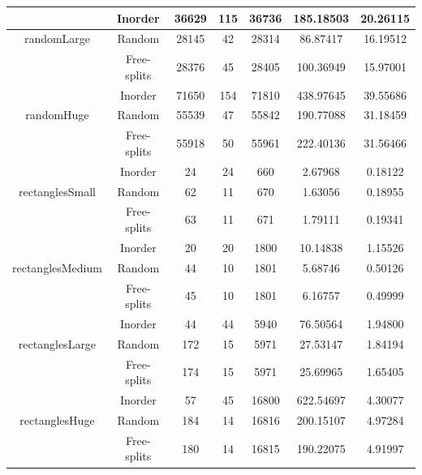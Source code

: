 \documentclass[11pt,a4paper]{article}
\theoremstyle{definition}
\theoremstyle{remark}
\begin{document}
\begin{table}
{\begin{tabular}{|c|c||c|c|c|c|c|}
\hline  
  & Inorder & 36629 & 115 & 36736 & 185.18503 & 20.26115 \\ 
\hline 
randomLarge & Random & 28145 & 42 & 28314 & 86.87417 & 16.19512 \\ 
\hline 
  & Free-splits & 28376 & 45 & 28405 & 100.36949 & 15.97001 \\ 
\hline
  & Inorder & 71650 & 154 & 71810 & 438.97645 & 39.55686 \\ 
\hline 
randomHuge & Random & 55539 & 47 & 55842 & 190.77088 & 31.18459 \\ 
\hline 
  & Free-splits & 55918 & 50 & 55961 & 222.40136 & 31.56466 \\ 
\hline
  & Inorder & 24 & 24 & 660 & 2.67968 & 0.18122 \\ 
\hline 
rectanglesSmall & Random & 62 & 11 & 670 & 1.63056 & 0.18955 \\ 
\hline 
  & Free-splits & 63 & 11 & 671 & 1.79111 & 0.19341 \\ 
\hline
  & Inorder & 20 & 20 & 1800 & 10.14838 & 1.15526 \\ 
\hline 
rectanglesMedium & Random & 44 & 10 & 1801 & 5.68746 & 0.50126 \\ 
\hline 
  & Free-splits & 45 & 10 & 1801 & 6.16757 & 0.49999 \\ 
\hline  
  & Inorder & 44 & 44 & 5940 & 76.50564 & 1.94800 \\ 
\hline 
rectanglesLarge & Random & 172 & 15 & 5971 & 27.53147 & 1.84194 \\ 
\hline 
  & Free-splits & 174 & 15 & 5971 & 25.69965 & 1.65405 \\ 
\hline
  & Inorder & 57 & 45 & 16800 & 622.54697 & 4.30077 \\ 
\hline 
rectanglesHuge & Random & 184 & 14 & 16816 & 200.15107 & 4.97284 \\ 
\hline 
  & Free-splits & 180 & 14 & 16815 & 190.22075 & 4.91997 \\ 
\hline


\end{tabular}}
\end{table}
\end{document}
